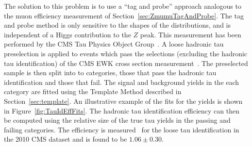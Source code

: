 The solution to this problem is to use a ``tag and probe'' approach analogous to
the muon efficiency measurement of Section~\ref{sec:ZmumuTagAndProbe}.  The tag
and probe method is only sensitive to the shapes of the distributions, and is
independent of a Higgs contribution to the $Z$ peak.  This measurement has been
performed by the CMS Tau Physics Object Group~\cite{CMS-PAS-TAU-11-001}.  A
loose hadronic tau preselection is applied to events which pass the selections
(excluding the hadronic tau identification) of the CMS EWK \ZTT cross section
measurement~\cite{CMS-PAS-EWK-10-013}.  The preselected sample is then split
into to categories, those that pass the hadronic tau identification and those
that fail.  The signal and background yields in the each category are fitted
using the Template Method described in Section~\ref{sec:template}.  An
illustrative example of the fits for the yields is shown in
Figure~\ref{fig:TauIdEffFits}.  The hadronic tau identification efficiency can
then be computed using the relative size of the true tau yields in the passing
and failing categories.  The efficiency is measured~\cite{CMS-PAS-TAU-11-001}
for the loose \hpsTanc tau identification in the 2010 CMS dataset and is found
to be \mbox{$1.06 \pm 0.30$}. 
%
